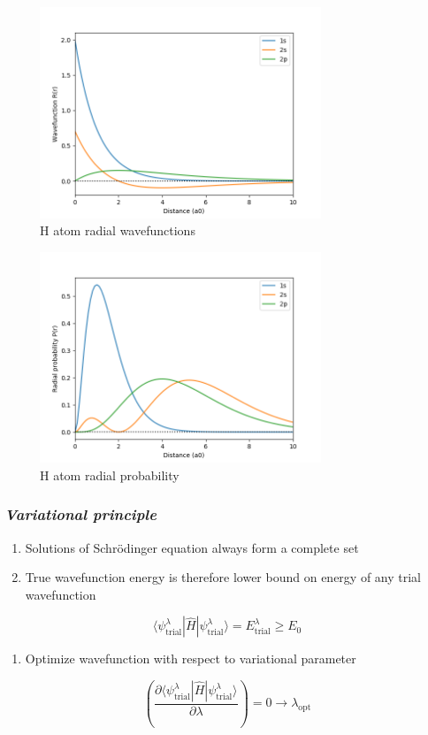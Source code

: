 \documentclass[11pt]{article}
\begin{document}
\begin{figure}[htbp]
\centering
\includegraphics[width=0.75\textwidth]{./Images/H-R.png}
\caption{H atom radial wavefunctions}
\end{figure} 
\begin{figure}[htbp]
\centering
\includegraphics[width=0.75\textwidth]{./Images/H-P.png}
\caption{H atom radial probability}
\end{figure} 

\subsubsection{\emph{Variational principle}}
\label{sec:org772a586}
\begin{enumerate}
\item Solutions of Schr\"{o}dinger equation always form a complete set
\item True wavefunction energy is therefore lower bound on energy of any trial wavefunction
\end{enumerate}
\[\langle \psi_\text{trial}^\lambda | \hat{H} | \psi_\text{trial}^\lambda\rangle =E_\text{trial}^\lambda \geq E_0\]
\begin{enumerate}
\item Optimize wavefunction with respect to variational parameter
\end{enumerate}
\[ \left ( \frac{\partial \langle \psi_\text{trial}^\lambda | \hat{H} | \psi_\text{trial}^\lambda\rangle}{\partial\lambda} \right ) = 0 \rightarrow \lambda_\text{opt} \] 
\end{document}
